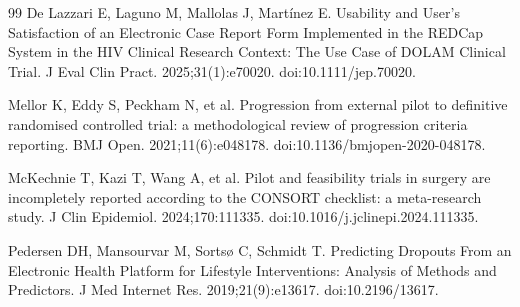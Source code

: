 \documentclass[11pt,a4paper]{article}
\begin{document}
\begin{thebibliography}{99}
 De Lazzari E, Laguno M, Mallolas J, Martínez E. Usability and User's Satisfaction of an Electronic Case Report Form Implemented in the REDCap System in the HIV Clinical Research Context: The Use Case of DOLAM Clinical Trial. J Eval Clin Pract. 2025;31(1):e70020. doi:10.1111/jep.70020.

 Mellor K, Eddy S, Peckham N, et al. Progression from external pilot to definitive randomised controlled trial: a methodological review of progression criteria reporting. BMJ Open. 2021;11(6):e048178. doi:10.1136/bmjopen-2020-048178.

 McKechnie T, Kazi T, Wang A, et al. Pilot and feasibility trials in surgery are incompletely reported according to the CONSORT checklist: a meta-research study. J Clin Epidemiol. 2024;170:111335. doi:10.1016/j.jclinepi.2024.111335.

 Pedersen DH, Mansourvar M, Sortsø C, Schmidt T. Predicting Dropouts From an Electronic Health Platform for Lifestyle Interventions: Analysis of Methods and Predictors. J Med Internet Res. 2019;21(9):e13617. doi:10.2196/13617.

\end{thebibliography}
\end{document}
